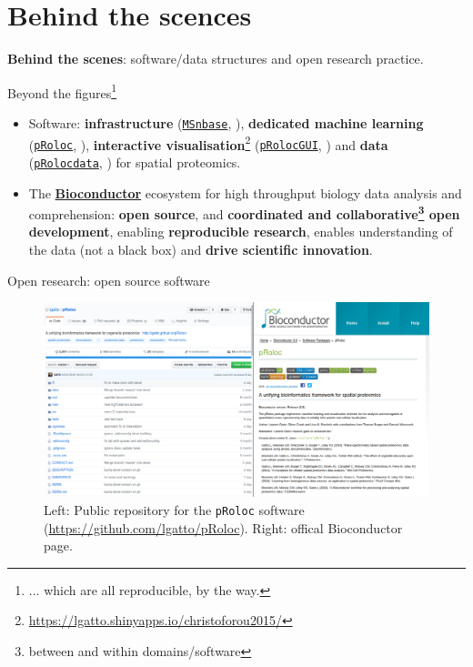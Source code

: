 \documentclass{beamer}
\theoremstyle{example}
\begin{document}
\section{Behind the scences}


\begin{frame}{}
  \begin{center}
    \Large{\textbf{Behind the scenes}: software/data structures and
      open research practice.}
  \end{center}
\end{frame}


\begin{frame}{}

  Beyond the figures\footnote{... which are all reproducible, by the way.}

  \begin{itemize}
  \item<+-> Software: \textbf{infrastructure}
    (\href{http://bioconductor.org/packages/MSnbase}{\texttt{MSnbase}},
    \cite{Gatto:2012}), \textbf{dedicated machine learning}
    (\href{http://bioconductor.org/packages/pRoloc}{\texttt{pRoloc}},
    \cite{Gatto:2014a}), \textbf{interactive
      visualisation}\footnote{\url{https://lgatto.shinyapps.io/christoforou2015/}}
    (\href{http://bioconductor.org/packages/pRolocGUI}{\texttt{pRolocGUI}},
    \cite{pRolocGUI}) and \textbf{data}
    (\href{http://bioconductor.org/packages/pRolocdata}{\texttt{pRolocdata}},
    \cite{Gatto:2014a}) for spatial proteomics.
  \item<+-> The \href{http://bioconductor.org/}{\textbf{Bioconductor}}
    \citep{Huber:2015} ecosystem for high throughput biology data
    analysis and comprehension: \textbf{open source}, and
    \textbf{coordinated and collaborative\footnote{between and within
        domains/software} open development}, enabling
    \textbf{reproducible research}, enables understanding of the data
    (not a black box) and \textbf{drive scientific innovation}.
  \end{itemize}
\end{frame}

\begin{frame}{Open research: open source software}
  \centering
  \begin{figure}
  \includegraphics[width=\linewidth]{./figs/pRoloc_screen.png}
    \caption{\cite{Gatto:2014} Left: Public repository for the \texttt{pRoloc} software
      (\url{https://github.com/lgatto/pRoloc}). Right: offical
      Bioconductor page.}
  \end{figure}
\end{frame}
\end{document}

